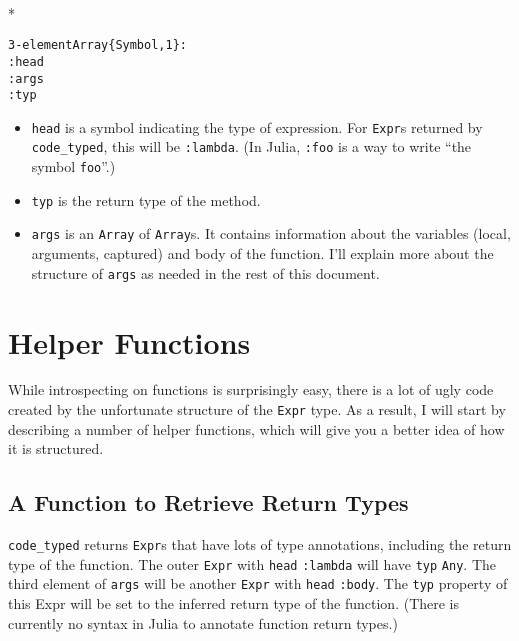 \documentclass[letterpaper,10pt,english]{/usr/share/sphinx/texinputs/sphinxhowto}
\def\smaller{\fontsize{9.5pt}{9.5pt}\selectfont}
\newenvironment{InvisibleVerbatim}
        {\begin{mdframed}[leftmargin=0.1\linewidth,innerleftmargin=3pt,innerrightmargin=3pt, userdefinedwidth=1\linewidth, linewidth=0pt, linecolor=white, usetwoside=false]}
        {\end{mdframed}}
\begin{document}
        

            
                \makebox[0.1\linewidth]{\smaller\hfill\tt\color{nbframe-out-prompt}Out\hspace{4pt}{[}4{]}:\hspace{4pt}}\\*
                \vspace{-2.55\baselineskip}\begin{InvisibleVerbatim}
                \vspace{-0.5\baselineskip}
\begin{alltt}3-element Array\{Symbol,1\}:
 :head
 :args
 :typ\end{alltt}

            \end{InvisibleVerbatim}
            
        
    
\begin{itemize}
\item
  \texttt{head} is a symbol indicating the type of expression. For
  \texttt{Expr}s returned by \texttt{code\_typed}, this will be
  \texttt{:lambda}. (In Julia, \texttt{:foo} is a way to write ``the
  symbol \texttt{foo}''.)
\item
  \texttt{typ} is the return type of the method.
\item
  \texttt{args} is an \texttt{Array} of \texttt{Array}s. It contains
  information about the variables (local, arguments, captured) and body
  of the function. I'll explain more about the structure of
  \texttt{args} as needed in the rest of this document.
\end{itemize}\section{Helper Functions}While introspecting on functions is surprisingly easy, there is a lot of
ugly code created by the unfortunate structure of the \texttt{Expr}
type. As a result, I will start by describing a number of helper
functions, which will give you a better idea of how it is structured.\subsection{A Function to Retrieve Return Types}\texttt{code\_typed} returns \texttt{Expr}s that have lots of type
annotations, including the return type of the function. The outer
\texttt{Expr} with \texttt{head} \texttt{:lambda} will have \texttt{typ}
\texttt{Any}. The third element of \texttt{args} will be another
\texttt{Expr} with \texttt{head} \texttt{:body}. The \texttt{typ}
property of this Expr will be set to the inferred return type of the
function. (There is currently no syntax in Julia to annotate function
return types.)
\end{document}
